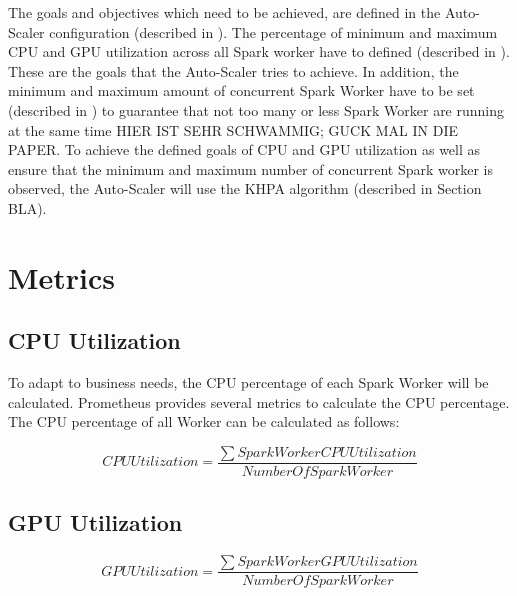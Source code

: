 The goals and objectives which need to be achieved, are defined in the Auto-Scaler configuration (described in ).
The percentage of minimum and maximum CPU and GPU utilization across all Spark worker have to defined (described in ). These are the goals that the Auto-Scaler tries to achieve.
In addition, the minimum and maximum amount of concurrent Spark Worker have to be set (described in ) to guarantee that not too many or less Spark Worker are running at the same time HIER IST SEHR SCHWAMMIG; GUCK MAL IN DIE PAPER.
%
To achieve the defined goals of CPU and GPU utilization as well as ensure that the minimum and maximum number of concurrent Spark worker is observed, the Auto-Scaler will use the KHPA algorithm (described in Section BLA).


\section{Metrics}

\subsection{CPU Utilization}

To adapt to business needs, the CPU percentage of each Spark Worker will be calculated. Prometheus provides several metrics to calculate the CPU percentage. The CPU percentage of all Worker can be calculated as follows:

\begin{equation}
CPUUtilization = \dfrac{\sum SparkWorkerCPUUtilization}{NumberOfSparkWorker}
\label{eq:formel}
\end{equation}


\subsection{GPU Utilization}

\begin{equation}
GPUUtilization = \dfrac{\sum SparkWorkerGPUUtilization}{NumberOfSparkWorker}
\label{eq:formel}
\end{equation}

